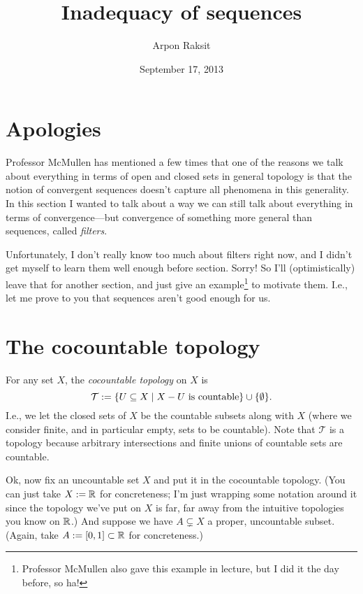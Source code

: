 

\title{Inadequacy of sequences}
\author{Arpon Raksit}
\date{September 17, 2013}


\maketitle
\thispagestyle{fancy}


\section{Apologies}

Professor McMullen has mentioned a few times that one of the reasons
we talk about everything in terms of open and closed sets in general
topology is that the notion of convergent sequences doesn't capture
all phenomena in this generality. In this section I wanted to talk
about a way we can still talk about everything in terms of
convergence---but convergence of something more general than
sequences, called \textit{filters}.

Unfortunately, I don't really know too much about filters right now,
and I didn't get myself to learn them well enough before
section. Sorry! So I'll (optimistically) leave that for another
section, and just give an example\footnote{Professor McMullen also
  gave this example in lecture, but I did it the day before, so ha!}
to motivate them. I.e., let me prove to you that sequences aren't good
enough for us.

\renewcommand{\T}{\mathcal{T}}

\section{The cocountable topology}

\begin{definition}
  For any set $X$, the \textit{cocountable topology} on $X$ is
\[
\T \ce \{U \subseteq X \mid X - U \text{ is countable}\} \cup
\{\emptyset\}.
\]
I.e., we let the closed sets of $X$ be the countable subsets along
with $X$ (where we consider finite, and in particular empty, sets to
be countable). Note that $\T$ is a topology because arbitrary
intersections and finite unions of countable sets are countable.
\end{definition}

\begin{nothing}
  Ok, now fix an uncountable set $X$ and put it in the cocountable
  topology. (You can just take $X \mathrel{:=} \mathbb{R}$ for concreteness; I'm just
  wrapping some notation around it since the topology we've put on $X$
  is far, far away from the intuitive topologies you know on $\mathbb{R}$.)  And
  suppose we have $A \subsetneq X$ a proper, uncountable subset. (Again,
  take $A \mathrel{:=} [0, 1] \subset \mathbb{R}$ for concreteness.)
\end{nothing}

